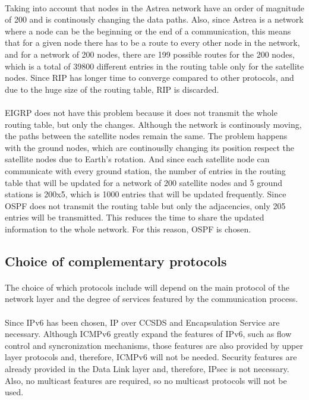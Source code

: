 \documentclass[12pt,a4paper]{report}
\begin{document}
\paragraph{}Taking into account that nodes in the Astrea network have an order of magnitude of 200 and is continously changing the data paths. Also, since Astrea is a network where a node can be the beginning or the end of a communication, this means that for a given node there has to be a route to every other node in the network, and for a network of 200 nodes, there are 199 possible routes for the 200 nodes, which is a total of 39800 different entries in the routing table only for the satellite nodes. Since RIP has longer time to converge compared to other protocols, and due to the huge size of the routing table, RIP is discarded.
\paragraph{}EIGRP does not have this problem because it does not transmit the whole routing table, but only the changes. Although the network is continously moving, the paths between the satellite nodes remain the same. The problem happens with the ground nodes, which are continouslly changing its position respect the satellite nodes due to Earth's rotation. And since each satellite node can communicate with every ground station, the number of entries in the routing table that will be updated for a network of 200 satellite nodes and 5 ground stations is 200x5, which is 1000 entries that will be updated frequently. Since OSPF does not transmit the routing table but only the adjacencies, only 205 entries will be transmitted. This reduces the time to share the updated information to the whole network. For this reason, OSPF is chosen.

\subsection{Choice of complementary protocols}
\paragraph{}The choice of which protocols include will depend on the main protocol of the network layer and the degree of services featured by the communication process.
\paragraph{}Since IPv6 has been chosen, IP over CCSDS and Encapsulation Service are necessary. Although ICMPv6 greatly expand the features of IPv6, such as flow control and syncronization mechanisms, those features are also provided by upper layer protocols and, therefore, ICMPv6 will not be needed. Security features are already provided in the Data Link layer and, therefore, IPsec is not necessary. Also, no multicast features are required, so no multicast protocols will not be used.
\end{document}
